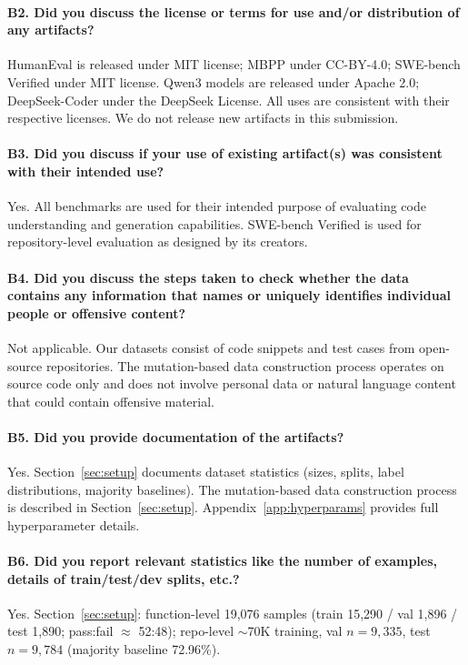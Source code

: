 \paragraph{B2. Did you discuss the license or terms for use and/or distribution of any artifacts?}
HumanEval is released under MIT license; MBPP under CC-BY-4.0; SWE-bench Verified under MIT license. Qwen3 models are released under Apache 2.0; DeepSeek-Coder under the DeepSeek License. All uses are consistent with their respective licenses. We do not release new artifacts in this submission.

\paragraph{B3. Did you discuss if your use of existing artifact(s) was consistent with their intended use?}
Yes. All benchmarks are used for their intended purpose of evaluating code understanding and generation capabilities. SWE-bench Verified is used for repository-level evaluation as designed by its creators.

\paragraph{B4. Did you discuss the steps taken to check whether the data contains any information that names or uniquely identifies individual people or offensive content?}
Not applicable. Our datasets consist of code snippets and test cases from open-source repositories. The mutation-based data construction process operates on source code only and does not involve personal data or natural language content that could contain offensive material.

\paragraph{B5. Did you provide documentation of the artifacts?}
Yes. Section~\ref{sec:setup} documents dataset statistics (sizes, splits, label distributions, majority baselines). The mutation-based data construction process is described in Section~\ref{sec:setup}. Appendix~\ref{app:hyperparams} provides full hyperparameter details.

\paragraph{B6. Did you report relevant statistics like the number of examples, details of train/test/dev splits, etc.?}
Yes. Section~\ref{sec:setup}: function-level 19,076 samples (train 15,290 / val 1,896 / test 1,890; pass:fail $\approx$ 52:48); repo-level ${\sim}$70K training, val $n{=}9{,}335$, test $n{=}9{,}784$ (majority baseline 72.96\%).

